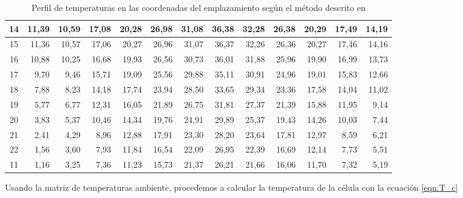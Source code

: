 \begin{table}[ht]
\begin{tabular}{|c|r|r|r|r|r|r|r|r|r|r|r|r|}
14 & 11,39 & 10,59 & 17,08 & 20,28 & 26,98 & 31,08 & 36,38 & 32,28 & 26,38 & 20,29 & 17,49 & 14,19 \\ \hline
15 & 11,36 & 10,57 & 17,06 & 20,27 & 26,96 & 31,07 & 36,37 & 32,26 & 26,36 & 20,27 & 17,46 & 14,16 \\ \hline
16 & 10,88 & 10,25 & 16,68 & 19,93 & 26,56 & 30,73 & 36,01 & 31,88 & 25,96 & 19,90 & 16,99 & 13,73 \\ \hline
17 & 9,70  & 9,46  & 15,71 & 19,09 & 25,56 & 29,88 & 35,11 & 30,91 & 24,96 & 19,01 & 15,83 & 12,66 \\ \hline
18 & 7,88  & 8,23  & 14,18 & 17,74 & 23,94 & 28,50 & 33,65 & 29,34 & 23,36 & 17,58 & 14,04 & 11,02 \\ \hline
19 & 5,77  & 6,77  & 12,31 & 16,05 & 21,89 & 26,75 & 31,81 & 27,37 & 21,39 & 15,88 & 11,95 & 9,14  \\ \hline
20 & 3,83  & 5,37  & 10,46 & 14,34 & 19,76 & 24,91 & 29,89 & 25,37 & 19,43 & 14,26 & 10,03 & 7,44  \\ \hline
21 & 2,41  & 4,29  & 8,96  & 12,88 & 17,91 & 23,30 & 28,20 & 23,64 & 17,81 & 12,97 & 8,59  & 6,21  \\ \hline
22 & 1,56  & 3,60  & 7,93  & 11,84 & 16,54 & 22,09 & 26,95 & 22,39 & 16,69 & 12,14 & 7,73  & 5,51  \\ \hline
11 & 1,16  & 3,25  & 7,36  & 11,23 & 15,73 & 21,37 & 26,21 & 21,66 & 16,06 & 11,70 & 7,32  & 5,19  \\ \hline
\end{tabular}
\caption{Perfil de temperaturas en las coordenadas del emplazamiento según el método descrito en \cite{temp_paper} \label{tab:temp_profiles}}
\end{table}

Usando la matriz de temperaturas ambiente, procedemos a calcular la temperatura de la célula con la ecuación \ref{eqn:T_c}




